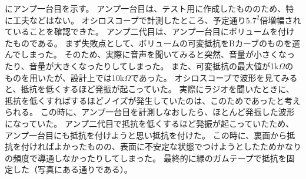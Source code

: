 \documentclass[report.tex]{subfiles}
\begin{document}
にアンプ一台目を示す。
アンプ一台目は、テスト用に作成したもののため、特に工夫などはない。
オシロスコープで計測したところ、予定通り\(5.7^2\)倍増幅されていることを確認できた。
アンプ二代目は、アンプ一台目にボリュームを付けたものである。
まず失敗点として、ボリュームの可変抵抗をBカーブのものを選んでしまった。
そのため、実際に音声を聞いてみると突然、音量が小さくなったり、音量が大きくなったりしてしまった。
また、可変抵抗の最大値が1k\(\Omega\)のものを用いたが、設計上では10k\(\Omega\)であった。
オシロスコープで波形を見てみると、抵抗を低くするほど発振が起こっていた。
実際にラジオを聞いたときに、抵抗を低くすればするほどノイズが発生していたのは、このためであったと考えられる。
この時に、アンプ一台目を計測しなおしたら、ほとんど発振した波形になっていた。
アンプ二代目で抵抗を低くするほど発振が起こっていたため、アンプ一台目にも抵抗を付けようと思い抵抗を付けた。
この時に、裏面から抵抗を付ければよかったものの、表面に不安定な状態でつけようとしたためかなりの頻度で導通しなかったりしてしまった。
最終的に緑のガムテープで抵抗を固定した（写真にある通りである）。
\end{document}
